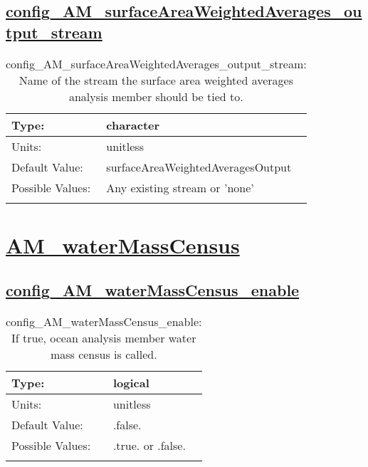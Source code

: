 \subsection[config\_AM\_surfaceAreaWeightedAverages\_output\_stream]{\hyperref[sec:nm_tab_AM_surfaceAreaWeightedAverages]{config\_AM\_surfaceAreaWeightedAverages\_output\_stream}}
\label{subsec:nm_sec_config_AM_surfaceAreaWeightedAverages_output_stream}
\begin{center}
\begin{longtable}{| p{2.0in} || p{4.0in} |}
    \hline
    Type: & character \\
    \hline
    Units: & \si{unitless} \\
    \hline
    Default Value: & surfaceAreaWeightedAveragesOutput \\
    \hline
    Possible Values: & Any existing stream or 'none' \\
    \hline
    \caption{config\_AM\_surfaceAreaWeightedAverages\_output\_stream: Name of the stream the surface area weighted averages analysis member should be tied to.}
\end{longtable}
\end{center}
\section[AM\_waterMassCensus]{\hyperref[sec:nm_tab_AM_waterMassCensus]{AM\_waterMassCensus}}
\label{sec:nm_sec_AM_waterMassCensus}
\subsection[config\_AM\_waterMassCensus\_enable]{\hyperref[sec:nm_tab_AM_waterMassCensus]{config\_AM\_waterMassCensus\_enable}}
\label{subsec:nm_sec_config_AM_waterMassCensus_enable}
\begin{center}
\begin{longtable}{| p{2.0in} || p{4.0in} |}
    \hline
    Type: & logical \\
    \hline
    Units: & \si{unitless} \\
    \hline
    Default Value: & .false. \\
    \hline
    Possible Values: & .true. or .false. \\
    \hline
    \caption{config\_AM\_waterMassCensus\_enable: If true, ocean analysis member water mass census is called.}
\end{longtable}
\end{center}
